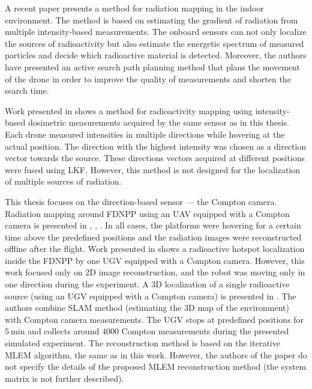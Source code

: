 A recent paper \cite{mascarich2022} presents a method for radiation mapping in the indoor environment.
The method is based on estimating the gradient of radiation from multiple intensity-based measurements.
The onboard sensors can not only localize the sources of radioactivity but also estimate the energetic spectrum of measured particles and decide which radioactive material is detected.
Moreover, the authors have presented an active search path planning method that plans the movement of the drone in order to improve the quality of measurements and shorten the search time.

Work presented in \cite{stibinger2020} shows a method for radioactivity mapping using intensity-based dosimetric measurements acquired by the same sensor as in this thesis.
Each drone measured intensities in multiple directions while hovering at the actual position.
The direction with the highest intensity was chosen as a direction vector towards the source.
These directions vectors acquired at different positions were fused using \ac{LKF}.
However, this method is not designed for the localization of multiple sources of radiation.

This thesis focuses on the direction-based sensor --- the Compton camera.
Radiation mapping around \ac{FDNPP} using an \ac{UAV} equipped with a Compton camera is presented in \cite{Jiang2015}, \cite{Mochizuki_2017}, \cite{sato_drone_compton_camera_2018}.
In all cases, the platforms were hovering for a certain time above the predefined positions and the radiation images were reconstructed offline after the flight.
Work presented in \cite{fuku_compton} shows a radioactive hotspot localization inside the \ac{FDNPP} by one \ac{UGV} equipped with a Compton camera.
However, this work focused only on 2D image reconstruction, and the robot was moving only in one direction during the experiment.
A 3D localization of a single radioactive source (using an \ac{UGV} equipped with a Compton camera) is presented in \cite{3D_compton_mobile_robot_2017}.
The authors combine \ac{SLAM} method (estimating the 3D map of the environment) with Compton camera measurements. %
The \ac{UGV} stops at predefined positions for $\SI{5}{\minute}$ and collects around $4000$ Compton measurements during the presented simulated experiment.
The reconstruction method is based on the iterative \ac{MLEM} algorithm, the same as in this work.
However, the authors of the paper do not specify the details of the proposed \ac{MLEM} reconstruction method (the system matrix is not further described).

